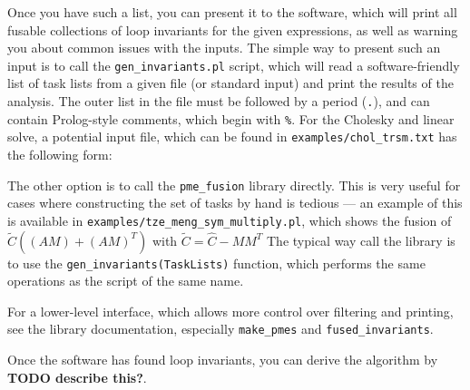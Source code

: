 \documentclass[12pt,letterpaper]{article}
\begin{document}
Once you have such a list, you can present it to the software, which will print all fusable collections of loop invariants for the given expressions, as well as warning you about common issues with the inputs.
The simple way to present such an input is to call the \texttt{gen\_invariants.pl} script, which will read a software-friendly list of task lists from a given file (or standard input) and print the results of the analysis.
The outer list in the file must be followed by a period (\texttt{.}), and can contain Prolog-style comments, which begin with \texttt{\%}.
For the Cholesky and linear solve, a potential input file, which can be found in \texttt{examples/chol\_trsm.txt} has the following form:


The other option is to call the \texttt{pme\_fusion} library directly.
This is very useful for cases where constructing the set of tasks by hand is tedious --- an example of this is available in \texttt{examples/tze\_meng\_sym\_multiply.pl}, which shows the fusion of $\widetilde{C} ((AM) + (AM)^T)$ with $\widetilde{C} = \hat{C} - MM^T$
The typical way call the library is to use the \texttt{gen\_invariants(TaskLists)} function, which performs the same operations as the script of the same name.

For a lower-level interface, which allows more control over filtering and printing, see the library documentation, especially \texttt{make\_pmes} and \texttt{fused\_invariants}.

Once the software has found loop invariants, you can derive the algorithm by \textbf{TODO describe this?}.
\end{document}
